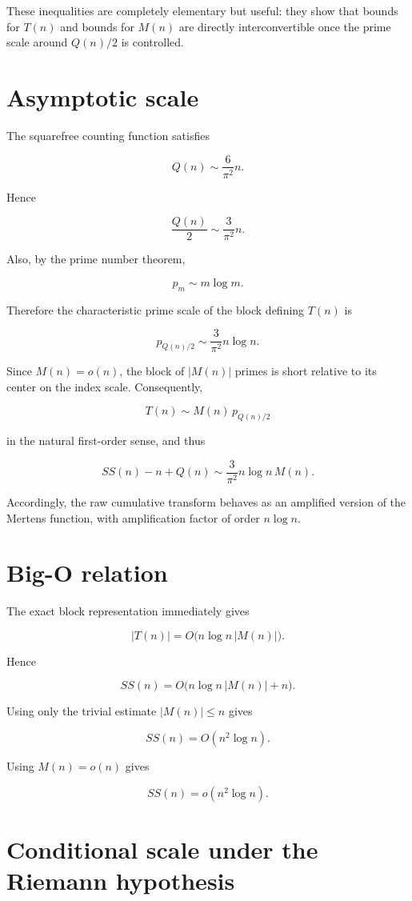 \documentclass[11pt]{amsart}
\newcommand{\Mert}{M}
\newcommand{\Sq}{Q}
\begin{document}
These inequalities are completely elementary but useful: they show that bounds for $T(n)$ and bounds for $\Mert(n)$ are directly interconvertible once the prime scale around $\Sq(n)/2$ is controlled.

\section{Asymptotic scale}

The squarefree counting function satisfies

\[
\Sq(n)\sim \frac{6}{\pi^2}n.
\]

Hence

\[
\frac{\Sq(n)}2
\sim
\frac{3}{\pi^2}n.
\]

Also, by the prime number theorem,

\[
p_m\sim m\log m.
\]

Therefore the characteristic prime scale of the block defining $T(n)$ is

\[
p_{\Sq(n)/2}
\sim
\frac{3}{\pi^2}n\log n.
\]

Since $\Mert(n)=o(n)$, the block of $|\Mert(n)|$ primes is short relative to its center on the index scale. Consequently,

\[
\boxed{
T(n)\sim \Mert(n)\,p_{\Sq(n)/2}
}
\]

in the natural first-order sense, and thus

\[
\boxed{
SS(n)-n+\Sq(n)
\sim
\frac{3}{\pi^2}n\log n\,\Mert(n).
}
\]

Accordingly, the raw cumulative transform behaves as an amplified version of the Mertens function, with amplification factor of order $n\log n$.

\section{Big-O relation}

The exact block representation immediately gives

\[
|T(n)|
=
O\!\bigl(n\log n\,|\Mert(n)|\bigr).
\]

Hence

\[
\boxed{
SS(n)
=
O\!\bigl(n\log n\,|\Mert(n)|+n\bigr).
}
\]

Using only the trivial estimate $|\Mert(n)|\le n$ gives

\[
SS(n)=O(n^2\log n).
\]

Using $\Mert(n)=o(n)$ gives

\[
SS(n)=o(n^2\log n).
\]

\section{Conditional scale under the Riemann hypothesis}
\end{document}
